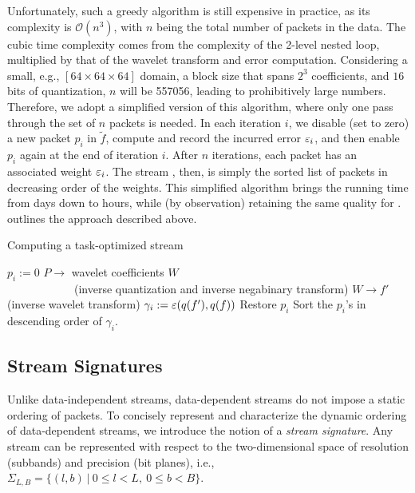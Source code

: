 Unfortunately, such a greedy algorithm is still expensive in practice, as its complexity is
$\mathcal{O}(n^3)$, with $n$ being the total number of packets in the data. The cubic time
complexity comes from the complexity of the 2-level nested loop, multiplied by that of the wavelet
transform and error computation. Considering a small, e.g., $[64 \times 64 \times 64]$ domain, a
block size that spans $2^3$ coefficients, and $16$ bits of quantization, $n$ will be 557056, leading
to prohibitively large numbers. Therefore, we adopt a simplified version of this algorithm, where
only one pass through the set of $n$ packets is needed. In each iteration $i$, we disable (set to
zero) a new packet $p_i$ in $\tilde{f}$, compute and record the incurred error $\err_i$, and then
enable $p_i$ again at the end of iteration $i$. After $n$ iterations, each packet has an associated
weight $\err_i$. The stream \sopt, then, is simply the sorted list of packets in decreasing order
of the weights. This simplified algorithm brings the running time from days down to hours, while (by
observation) retaining the same quality for \sopt.  outlines the approach
described above.

\begin{algorithm}[h]
  \caption{Computing a task-optimized stream}
  \begin{algorithmic}[1]
			\State $p_i := 0$
      \State $P \rightarrow$ wavelet coefficients $W$ \\
      		\ \ \ \ \ \ \ \ \ \ \ \ (inverse quantization and inverse negabinary transform)
			\State $W \rightarrow f'$ (inverse wavelet transform)
			\State $\gamma_i := \err(q(f'),q(f))$			
			\State Restore $p_i$
		\EndFor
		\State Sort the $p_i$'s in descending order of $\gamma_i$.
	\end{algorithmic}
	\label{alg:greedy}
\end{algorithm}

\subsection{Stream Signatures} \label{sec:stream-signature}
Unlike data-independent streams, data-dependent streams do not impose a static ordering of packets.
To concisely represent and characterize the dynamic ordering of data-dependent streams, we introduce
the notion of a \emph{stream signature}. Any stream can be represented with respect to the
two-dimensional space of resolution (subbands) and precision (bit planes), i.e., \mbox{$
\Sigma_{L,B}=\{(l,b)\ |\ 0\leq l < L,\ 0\leq b < B\}$.}

